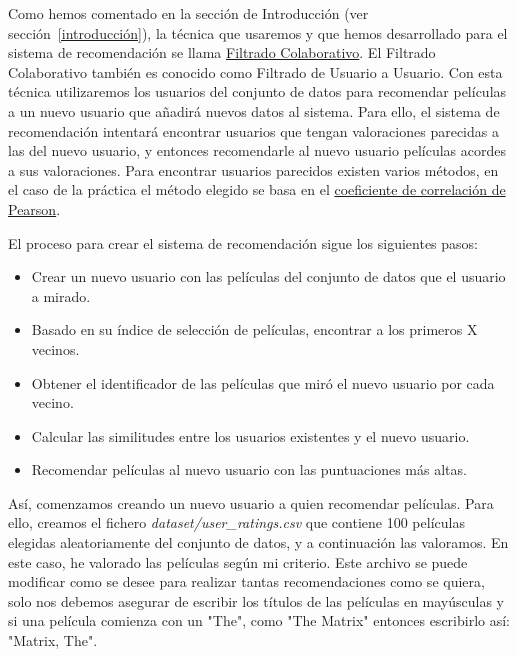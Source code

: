 \documentclass{uimppracticas}
\begin{document}
Como hemos comentado en la sección de Introducción (ver sección~\ref{introducción}), la técnica que usaremos y que hemos desarrollado para el sistema de recomendación se llama \href{https://es.wikipedia.org/wiki/Filtrado_colaborativo}{Filtrado Colaborativo}. El Filtrado Colaborativo también es conocido como Filtrado de Usuario a Usuario. Con esta técnica utilizaremos los usuarios del conjunto de datos para recomendar películas a un nuevo usuario que añadirá nuevos datos al sistema. Para ello, el sistema de recomendación intentará encontrar usuarios que tengan valoraciones parecidas a las del nuevo usuario, y entonces recomendarle al nuevo usuario películas acordes a sus valoraciones. Para encontrar usuarios parecidos existen varios métodos, en el caso de la práctica el método elegido se basa en el \href{https://es.wikipedia.org/wiki/Coeficiente_de_correlaci\%C3\%B3n_de_Pearson}{coeficiente de correlación de Pearson}. 

El proceso para crear el sistema de recomendación sigue los siguientes pasos:

\begin{itemize}
	\item Crear un nuevo usuario con las películas del conjunto de datos que el usuario a mirado.
	\item Basado en su índice de selección de películas, encontrar a los primeros X vecinos.
	\item Obtener el identificador de las películas que miró el nuevo usuario por cada vecino.
	\item Calcular las similitudes entre los usuarios existentes y el nuevo usuario.
	\item Recomendar películas al nuevo usuario con las puntuaciones más altas.
\end{itemize}

Así, comenzamos creando un nuevo usuario a quien recomendar películas. Para ello, creamos el fichero \textit{dataset/user\_ratings.csv} que contiene 100 películas elegidas aleatoriamente del conjunto de datos, y a continuación las valoramos. En este caso, he valorado las películas según mi criterio. Este archivo se puede modificar como se desee para realizar tantas recomendaciones como se quiera, solo nos debemos asegurar de escribir los títulos de las películas en mayúsculas y si una película comienza con un "The", como "The Matrix" entonces escribirlo así: "Matrix, The".

\newpage

\renewcommand{\refname}{Bibliografía}


	
\end{document}
